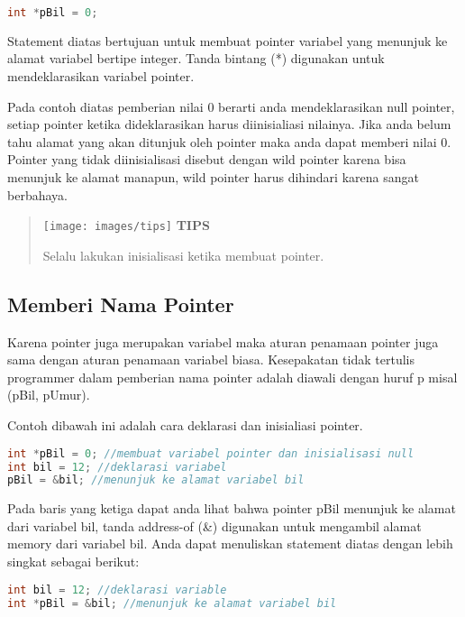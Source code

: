 \begin{lstlisting}[language=c++, numbers=none]
int *pBil = 0;
\end{lstlisting}

Statement diatas bertujuan untuk membuat pointer variabel yang menunjuk
ke alamat variabel bertipe integer. Tanda bintang (*) digunakan untuk
mendeklarasikan variabel pointer.

Pada contoh diatas pemberian nilai 0 berarti anda mendeklarasikan null
pointer, setiap pointer ketika dideklarasikan harus diinisialiasi
nilainya. Jika anda belum tahu alamat yang akan ditunjuk oleh pointer
maka anda dapat memberi nilai 0. Pointer yang tidak diinisialisasi
disebut dengan wild pointer karena bisa menunjuk ke alamat manapun, wild
pointer harus dihindari karena sangat berbahaya.

\begin{quotation}
\texttt{[image: images/tips]} \textbf{TIPS} 
	 
	 Selalu lakukan inisialisasi ketika membuat pointer.
\end{quotation}


\subsection{Memberi Nama Pointer}\label{memberi-nama-pointer}

Karena pointer juga merupakan variabel maka aturan penamaan pointer juga
sama dengan aturan penamaan variabel biasa. Kesepakatan tidak tertulis
programmer dalam pemberian nama pointer adalah diawali dengan huruf p
misal (pBil, pUmur).

Contoh dibawah ini adalah cara deklarasi dan inisialiasi pointer.

\begin{lstlisting}[language=c++, numbers=none]
int *pBil = 0; //membuat variabel pointer dan inisialisasi null
int bil = 12; //deklarasi variabel
pBil = &bil; //menunjuk ke alamat variabel bil
\end{lstlisting}

Pada baris yang ketiga dapat anda lihat bahwa pointer pBil menunjuk ke
alamat dari variabel bil, tanda address-of (\&) digunakan untuk
mengambil alamat memory dari variabel bil. Anda dapat menuliskan
statement diatas dengan lebih singkat sebagai berikut:

\begin{lstlisting}[language=c++, numbers=none]
int bil = 12; //deklarasi variable
int *pBil = &bil; //menunjuk ke alamat variabel bil
\end{lstlisting}

